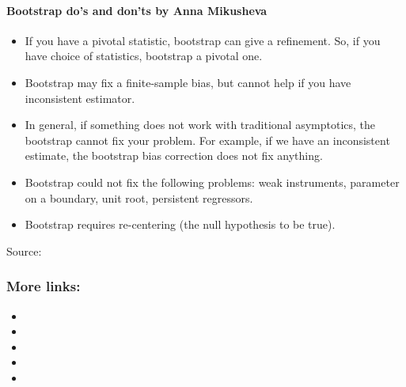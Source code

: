 \documentclass[letterpaper,10pt,english]{sphinxmanual}
\begin{document}
\paragraph{Bootstrap do’s and don’ts by Anna Mikusheva}
\label{\detokenize{concepts/bootstrap:bootstrap-dos-and-donts-by-anna-mikusheva}}\begin{itemize}
\item {} 
If you have a pivotal statistic,  bootstrap can give a refinement.  So, if you have choice
of statistics, bootstrap a pivotal one.

\item {} 
Bootstrap may fix a finite-sample bias, but cannot help if you have inconsistent estimator.

\item {} 
In  general,  if  something  does  not  work  with  traditional  asymptotics,  the
bootstrap  cannot  fix  your problem. For example, if we have an inconsistent estimate, the
bootstrap bias correction does not fix anything.

\item {} 
Bootstrap could not fix the following problems: weak instruments, parameter on a boundary,
unit root, persistent regressors.

\item {} 
Bootstrap requires re-centering (the null hypothesis to be true).

\end{itemize}

Source: 


\subsubsection{More links:}
\label{\detokenize{concepts/bootstrap:more-links}}\begin{itemize}
\item {} 

\item {} 

\item {} 

\item {} 

\item {} 

\end{itemize}
\end{document}
